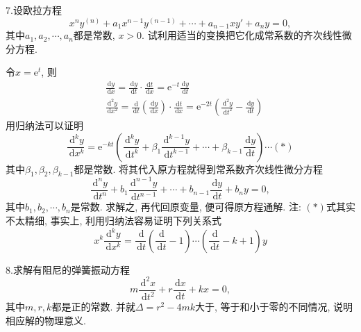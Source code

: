 \documentclass[titlepage,11pt,a4paper,twoside]{report}
\makeatletter
\newcommand\diff{\,\mathrm{d}}
\newcommand\e{\mathrm{e}}
\newenvironment{solve}{\par
	\pushQED{\qed}%
	\normalfont \topsep1\p@\@plus6\p@\relax
	\trivlist
	\item\relax
	{\hspace*{\parindent}{\heiti 解}\@addpunct{:}}\hspace\labelsep\ignorespaces
}{%
	\popQED\endtrivlist\@endpefalse
}
\makeatother
\begin{document}
7.设欧拉方程\[x^ny^{(n)}+a_1x^{n-1}y^{(n-1)}+\cdots+a_{n-1}xy'+a_ny=0,\]
其中$a_1,a_2,\cdots,a_n$都是常数, $x>0$. 试利用适当的变换把它化成常系数的齐次线性微分方程.
\begin{solve} 
令$x=\e^t$, 则
\[\begin{split}
&\frac{\diff y}{\diff x}=\frac{\diff y}{\diff t}\cdot\frac{\diff t}{\diff x}=\e^{-t}\frac{\diff y}{\diff t}\\
&\frac{\diff^2y}{\diff x^2}=\frac{\diff}{\diff t}\left(\frac{\diff y}{\diff x}\right)\cdot\frac{\diff t}{\diff x}=\e^{-2t}\left(\frac{\diff^2y}{\diff t^2}-\frac{\diff y}{\diff t}\right)
\end{split}\]
用归纳法可以证明
\[\frac{\diff^ky}{\diff x^k}=\e^{-kt}\left(\frac{\diff^ky}{\diff t^k}+\beta_1\frac{\diff^{k-1}y}{\diff t^{k-1}}+\cdots+\beta_{k-1}\frac{\diff y}{\diff t}\right)\cdots(*)\]
其中$\beta_1,\beta_2,\beta_{k-1}$都是常数. 将其代入原方程就得到常系数齐次线性微分方程
\[\frac{\diff^ny}{\diff t^n}+b_1\frac{\diff^{n-1}y}{\diff t^{n-1}}+\cdots+b_{n-1}\frac{\diff y}{\diff t}+b_ny=0,\]
其中$b_1,b_2,\cdots,b_n$是常数. 求解之, 再代回原变量, 便可得原方程通解.
\end{solve}
注: $(*)$式其实不太精细, 事实上, 利用归纳法容易证明下列关系式
\[x^k\frac{\diff^ky}{\diff x^k}=\frac{\diff}{\diff t}\left(\frac{\diff}{\diff t}-1\right)\cdots\left(\frac{\diff}{\diff t}-k+1\right)y\]
\par
8.求解有阻尼的弹簧振动方程
\[m\frac{\diff^2x}{\diff t^2}+r\frac{\diff x}{\diff t}+kx=0,\]
其中$m,r,k$都是正的常数. 并就$\Delta=r^2-4mk$大于, 等于和小于零的不同情况, 说明相应解的物理意义.
\end{document}
